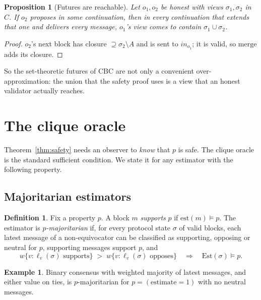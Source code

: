 \documentclass[11pt]{article}
\newtheorem{proposition}[theorem]{Proposition}
\theoremstyle{definition}
\newtheorem{definition}[theorem]{Definition}
\newtheorem{example}[theorem]{Example}
\theoremstyle{remark}
\newcommand{\est}{\mathrm{est}}
\newcommand{\Est}{\mathrm{Est}}
\newcommand{\merge}{\mathrm{merge}}
\begin{document}
\begin{proposition}[Futures are reachable]\label{prop:futures}
Let $o_1,o_2$ be honest with views $\sigma_1,\sigma_2$ in $C$. If $o_2$
proposes in some continuation, then in every continuation that extends that one
and delivers every message, $o_1$'s view comes to contain
$\sigma_1\cup\sigma_2$.
\end{proposition}

\begin{proof}
$o_2$'s next block has closure $\supseteq\sigma_2\setminus A$ and is sent to
$\mathit{in}_{o_1}$; it is valid, so $\merge$ adds its closure.
\end{proof}

So the set-theoretic futures of CBC are not only a convenient
over-approximation: the union that the safety proof uses is a view that an
honest validator actually reaches.

\section{The clique oracle}\label{sec:clique}

Theorem~\ref{thm:safety} needs an observer to \emph{know} that $p$ is safe.
The clique oracle is the standard sufficient condition. We state it for any
estimator with the following property.

\subsection{Majoritarian estimators}

\begin{definition}
Fix a property $p$. A block $m$ \emph{supports} $p$ if $\est(m)\models p$. The
estimator is \emph{$p$-majoritarian} if, for every protocol state $\sigma$ of
valid blocks, each latest message of a non-equivocator can be classified as
supporting, opposing or neutral for $p$, supporting messages support $p$, and
\[
w\{v : \ell_v(\sigma)\text{ supports}\} \;>\;
w\{v : \ell_v(\sigma)\text{ opposes}\}
\quad\Longrightarrow\quad \Est(\sigma)\models p .
\]
\end{definition}

\begin{example}
Binary consensus with weighted majority of latest messages, and either value
on ties, is $p$-majoritarian for $p=(\text{estimate}=1)$ with no neutral
messages.
\end{example}
\end{document}
